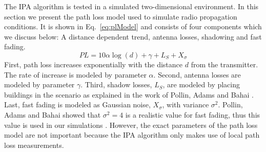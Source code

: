 The IPA algorithm is tested in a simulated two-dimensional environment. In this section we present the path loss model used to simulate radio propagation conditions. It is shown in Eq.~\ref{eq:plModel} and consists of four components which we discuss below: A distance dependent trend, antenna losses, shadowing and fast fading. 
\begin{equation} \label{eq:plModel}
PL=10\alpha\log(d)+\gamma+L_S+X_{\sigma}
\end{equation}
First, path loss increases exponentially with the distance $d$ from the transmitter. The rate of increase is modeled by parameter $\alpha$. Second, antenna losses are modeled by parameter $\gamma$. Third, shadow losses, $L_S$, are modeled by placing buildings in the scenario as explained in the work of Pollin, Adams and Bahai \cite{sofie}. Last, fast fading is modeled as Gaussian noise, $X_{\sigma}$, with variance $\sigma^2$. Pollin, Adams and Bahai showed that $\sigma^2=4$ is a realistic value for fast fading, thus this value is used in our simulations \cite{sofie}. However, the exact parameters of the path loss model are not important because the IPA algorithm only makes use of local path loss measurements.













